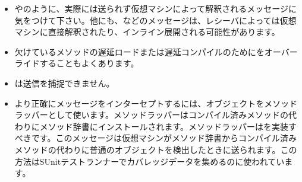 \documentclass[a4paper,10pt,twoside]{book}
\begin{document}
\begin{itemize}
\item {}やのように、実際には送られず仮想マシンによって解釈されるメッセージに気をつけて下さい。他にも\ct{+}\ct{-}、などのメッセージは、レシーバによっては仮想マシンに直接解釈されたり、インライン展開される可能性があります。
\item 欠けているメソッドの遅延ロードまたは遅延コンパイルのためにをオーバーライドすることもよくあります。
\item {}は\self 送信を捕捉できません。
\item より正確にメッセージをインターセプトするには、オブジェクトをメソッドラッパーとして使います。メソッドラッパーはコンパイル済みメソッドの代わりにメソッド辞書にインストールされます。メソッドラッパーはを実装すべきです。このメッセージは仮想マシンがメソッド辞書からコンパイル済みメソッドの代わりに普通のオブジェクトを検出したときに送られます。この方法はSUnitテストランナーでカバレッジデータを集めるのに使われています。
\end{itemize}

\ifx\wholebook\relax\else
   
   
\end{document}
